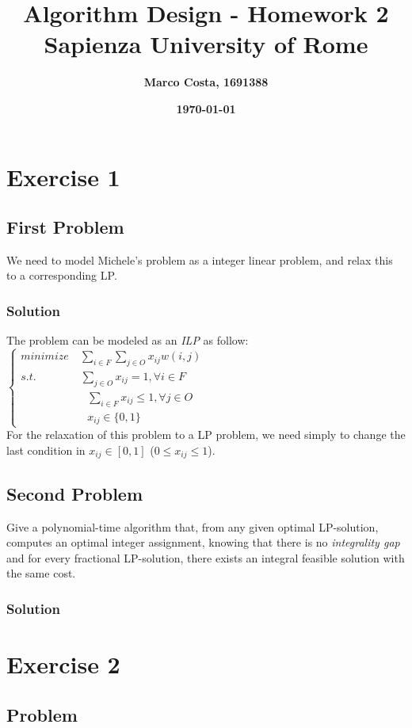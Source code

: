 \documentclass[11pt]{article}
\title{\textbf{Algorithm Design - Homework 2} \\ \bigskip \large \textbf{Sapienza University of Rome}}
\date{\textbf{\today}}
\author{\textbf{Marco Costa, 1691388}}
\begin{document}
\maketitle
\newpage

\section*{Exercise 1}
\subsection*{First Problem}
We need to model Michele's problem as a integer linear problem, and relax this to a corresponding LP.
\subsubsection*{Solution}
The problem can be modeled as an \textit{ILP} as follow: \\
\(\left \{ \begin{array}{l}
minimize \quad \sum\limits_{i \in F} \sum\limits_{j \in O}x_{ij}w(i,j)\\
s.t. \qquad \qquad \sum\limits_{j \in O}x_{ij} = 1 , \forall{i \in F}\\
\qquad \qquad \qquad \sum\limits_{i \in F}x_{ij} \leq 1 , \forall{j \in O}\\
\qquad \qquad \qquad x_{ij} \in{\{0,1\}}
\end{array}
\right. \)\\
For the relaxation of this problem to a LP problem, we need simply to change the last condition in $x_{ij} \in [0, 1]$ ($0 \leq x_{ij} \leq 1$).
\subsection*{Second Problem}
Give a polynomial-time algorithm that, from any
given optimal LP-solution, computes an optimal integer assignment, knowing that there is no \textit{integrality gap} and for every fractional LP-solution, there exists an integral
feasible solution with the same cost.
\subsubsection*{Solution}

\newpage

\section*{Exercise 2}
\subsection*{Problem}
\end{document}
